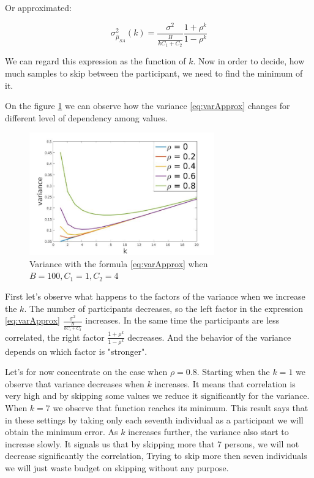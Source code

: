 \documentclass[12pt]{report}
\begin{document}
Or approximated:

\begin{equation}
\label{eq:varApprox}
 \sigma^2_{\hat{\mu}_{SA}} (k) = \frac{\sigma^2}{\frac{B}{kC_1 + C_2}} \frac{1+\rho^k}{1-\rho^k}
\end{equation}

We can regard this expression as the function of $k$. Now in order to decide, how much samples to skip between the participant, we need to find the minimum of it.


On the figure \ref{fig:varPredDifRho} we can observe how the variance \ref{eq:varApprox} changes for different level of dependency among values.


\begin{figure}[ht]
    \centering
    \includegraphics[height=200px]{varPredDifRho}
    \caption{Variance with the formula \ref{eq:varApprox} when $B = 100, C_1 = 1, C_2 = 4$}
    \label{fig:varPredDifRho}
\end{figure}

First let's observe what happens to the factors of the variance when we increase the $k$. The number of participants decreases, so the left factor in the expression \ref{eq:varApprox} $\frac{\sigma^2}{\frac{B}{kC_1 + C_2}}$ increases. In the same time the participants are less correlated, the right factor  $\frac{1+\rho^k}{1-\rho^k}$ decreases. And the behavior of the variance depends on which factor is "stronger".

Let's for now concentrate on the case when $\rho = 0.8$. Starting when the $k = 1$ we observe that variance decreases when $k$ increases. It means that correlation is very high and by skipping some values we reduce it significantly for the variance. When $k = 7$ we observe that function reaches its minimum. This result says that in these settings by taking only each seventh individual as a participant we will obtain the minimum error.  As $k$ increases further, the variance also start to increase slowly. It signals us that by skipping more that 7 persons, we will not decrease significantly the correlation, Trying to skip more then seven individuals we will just waste budget on skipping without any purpose.
\end{document}
